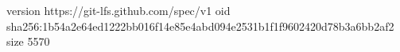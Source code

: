 version https://git-lfs.github.com/spec/v1
oid sha256:1b54a2e64ed1222bb016f14e85e4abd094e2531b1f1f9602420d78b3a6bb2af2
size 5570
